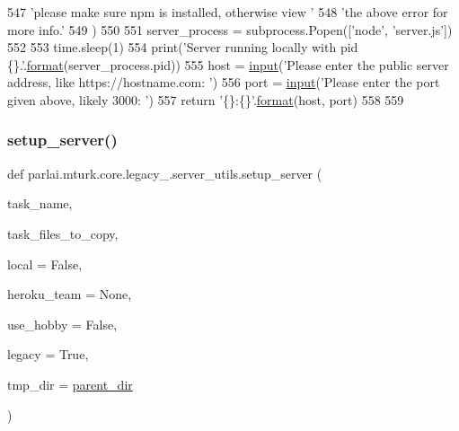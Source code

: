\begin{DoxyCode}
547             \textcolor{stringliteral}{'please make sure npm is installed, otherwise view '}
548             \textcolor{stringliteral}{'the above error for more info.'}
549         )
550 
551     server\_process = subprocess.Popen([\textcolor{stringliteral}{'node'}, \textcolor{stringliteral}{'server.js'}])
552 
553     time.sleep(1)
554     print(\textcolor{stringliteral}{'Server running locally with pid \{\}.'}.\hyperlink{namespaceparlai_1_1chat__service_1_1services_1_1messenger_1_1shared__utils_a32e2e2022b824fbaf80c747160b52a76}{format}(server\_process.pid))
555     host = \hyperlink{namespaceparlai_1_1mturk_1_1core_1_1dev_1_1test_1_1test__full__system_a1e1817cd65688fb90f827834d1fb4567}{input}(\textcolor{stringliteral}{'Please enter the public server address, like https://hostname.com: '})
556     port = \hyperlink{namespaceparlai_1_1mturk_1_1core_1_1dev_1_1test_1_1test__full__system_a1e1817cd65688fb90f827834d1fb4567}{input}(\textcolor{stringliteral}{'Please enter the port given above, likely 3000: '})
557     \textcolor{keywordflow}{return} \textcolor{stringliteral}{'\{\}:\{\}'}.\hyperlink{namespaceparlai_1_1chat__service_1_1services_1_1messenger_1_1shared__utils_a32e2e2022b824fbaf80c747160b52a76}{format}(host, port)
558 
559 
\end{DoxyCode}
\mbox{\label{namespaceparlai_1_1mturk_1_1core_1_1legacy__2018_1_1server__utils_af65b71753d79d3513be6d4c890853a4d}} 
\subsubsection{\texorpdfstring{setup\+\_\+server()}{setup\_server()}}
{\footnotesize\ttfamily def parlai.\+mturk.\+core.\+legacy\+\_.\+server\+\_\+utils.\+setup\+\_\+server (\begin{DoxyParamCaption}\item[{}]{task\+\_\+name,  }\item[{}]{task\+\_\+files\+\_\+to\+\_\+copy,  }\item[{}]{local = {\ttfamily False},  }\item[{}]{heroku\+\_\+team = {\ttfamily None},  }\item[{}]{use\+\_\+hobby = {\ttfamily False},  }\item[{}]{legacy = {\ttfamily True},  }\item[{}]{tmp\+\_\+dir = {\ttfamily \hyperlink{namespaceparlai_1_1mturk_1_1core_1_1legacy__2018_1_1server__utils_a6a871d2f8e5c0768a82ab8fa2e7fadae}{parent\+\_\+dir}} }\end{DoxyParamCaption})}




